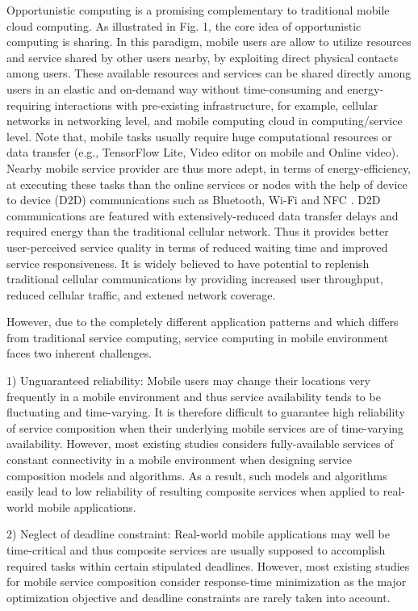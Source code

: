 \documentclass[journal]{IEEEtran}
\begin{document}
Opportunistic computing is a promising complementary to traditional mobile cloud computing. As illustrated in Fig. 1, the core idea of opportunistic computing is sharing. In this paradigm, mobile users are allow to utilize resources and service shared by other users nearby, by exploiting direct physical contacts among users.
These available resources and services can be shared directly among users in an elastic and on-demand way without time-consuming and energy-requiring interactions with pre-existing infrastructure, for example, cellular networks in networking level, and mobile computing cloud in computing/service level.
Note that, mobile tasks usually require huge computational resources or data transfer (e.g., TensorFlow Lite, Video editor on mobile and Online video). Nearby mobile service provider are thus more adept, in terms of energy-efficiency, at executing these tasks than the online services or nodes with the help of device to device (D2D) communications such as Bluetooth, Wi-Fi and NFC \cite{balani2007energy}. D2D communications are featured with extensively-reduced data transfer delays and required energy than the traditional cellular network. Thus it provides better user-perceived service quality in terms of reduced waiting time and improved service responsiveness. It is widely believed to have potential to replenish traditional cellular communications by providing increased user throughput, reduced cellular traffic, and extened network coverage.

However, due to the completely different application patterns and which differs from traditional service computing, service computing in mobile environment faces two inherent challenges.

1) Unguaranteed reliability: Mobile users may change their locations very frequently in a mobile environment and thus service availability tends to be fluctuating and time-varying. It is therefore difficult to guarantee high reliability of service composition when their underlying mobile services are of time-varying availability. However, most existing studies considers fully-available services of constant connectivity in a mobile environment when designing service composition models and algorithms. As a result, such models and algorithms easily lead to low reliability of resulting composite services when applied to real-world mobile applications.

2) Neglect of deadline constraint: Real-world mobile applications may well be time-critical and thus composite services are usually supposed to accomplish required tasks within certain stipulated deadlines. However, most existing studies for mobile service composition consider response-time minimization as the major optimization objective and deadline constraints are rarely taken into account.
\end{document}
